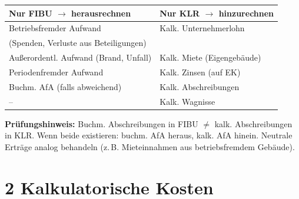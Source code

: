\documentclass[10pt,a4paper]{article}
\begin{document}
\begin{multicols}{2}
\vspace{4pt}
\begin{tabular}{|L{4cm}|L{3cm}|}
\hline
{}
\textbf{Nur FIBU $\to$ herausrechnen} & \textbf{Nur KLR $\to$ hinzurechnen} \\
\hline
Betriebsfremder Aufwand & Kalk. Unternehmerlohn \\
(Spenden, Verluste aus Beteiligungen) & \\
\hline
Außerordentl. Aufwand (Brand, Unfall) & Kalk. Miete (Eigengebäude) \\
\hline
Periodenfremder Aufwand & Kalk. Zinsen (auf EK) \\
\hline
Buchm. AfA (falls abweichend) & Kalk. Abschreibungen \\
\hline
-- & Kalk. Wagnisse \\
\hline
\end{tabular}

\vspace{4pt}
\begin{hinweisbox}
\textbf{Prüfungshinweis:} Buchm. Abschreibungen in FIBU $\ne$ kalk. Abschreibungen in KLR. Wenn beide existieren: buchm. AfA heraus, kalk. AfA hinein. Neutrale Erträge analog behandeln (z.\,B. Mieteinnahmen aus betriebsfremdem Gebäude).
\end{hinweisbox}

\end{multicols}

\newpage

\section{2 \quad Kalkulatorische Kosten}
\end{document}
